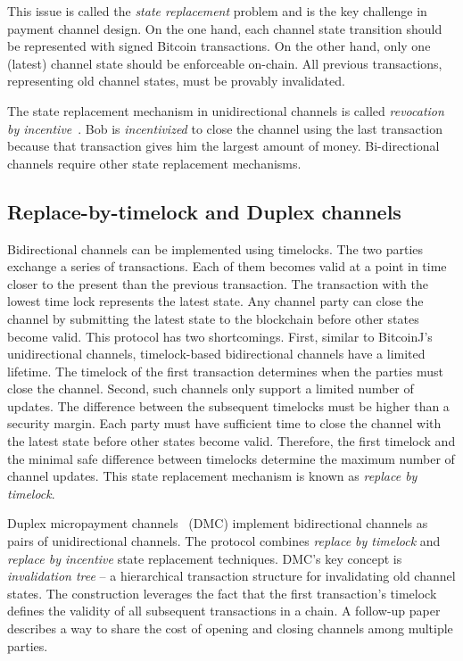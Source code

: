 This issue is called the \textit{state replacement} problem and is the key challenge in payment channel design.
On the one hand, each channel state transition should be represented with signed Bitcoin transactions.
On the other hand, only one (latest) channel state should be enforceable on-chain.
All previous transactions, representing old channel states, must be provably invalidated.

The state replacement mechanism in unidirectional channels is called \textit{revocation by incentive}~\cite{Gudgeon2019}.
Bob is \textit{incentivized} to close the channel using the last transaction because that transaction gives him the largest amount of money.
Bi-directional channels require other state replacement mechanisms.


\subsection{Replace-by-timelock and Duplex channels}

Bidirectional channels can be implemented using timelocks.
The two parties exchange a series of transactions.
Each of them becomes valid at a point in time closer to the present than the previous transaction.
The transaction with the lowest time lock represents the latest state.
Any channel party can close the channel by submitting the latest state to the blockchain before other states become valid.
This protocol has two shortcomings.
First, similar to BitcoinJ's unidirectional channels, timelock-based bidirectional channels have a limited lifetime.
The timelock of the first transaction determines when the parties must close the channel.
Second, such channels only support a limited number of updates.
The difference between the subsequent timelocks must be higher than a security margin.
Each party must have sufficient time to close the channel with the latest state before other states become valid.
Therefore, the first timelock and the minimal safe difference between timelocks determine the maximum number of channel updates.
This state replacement mechanism is known as \textit{replace by timelock}.

Duplex micropayment channels~\cite{Decker2015} (DMC) implement bidirectional channels as pairs of unidirectional channels.
The protocol combines \textit{replace by timelock} and \textit{replace by incentive} state replacement techniques.
DMC's key concept is \textit{invalidation tree} -- a hierarchical transaction structure for invalidating old channel states.
The construction leverages the fact that the first transaction's timelock defines the validity of all subsequent transactions in a chain.
A follow-up paper~\cite{Burchert2017} describes a way to share the cost of opening and closing channels among multiple parties.


